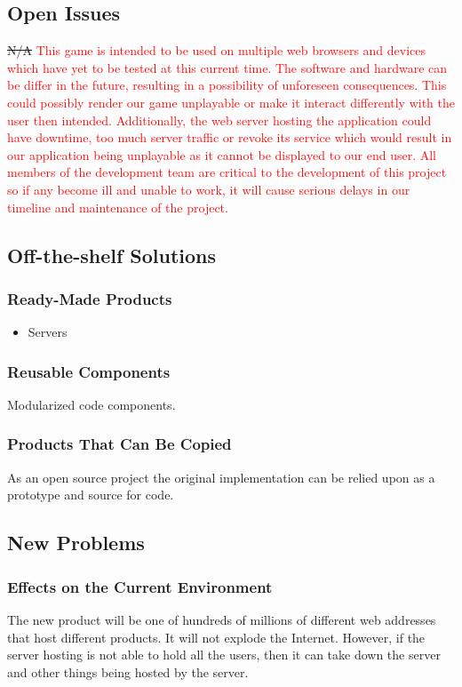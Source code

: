 \documentclass[11pt, oneside]{article}   	%
\begin{document}
\subsection{Open Issues}
\sout{N/A} \textcolor{red}{This game is intended to be used on multiple web browsers and devices which have yet to be tested at this current time. The software and hardware can be differ in the future, resulting in a possibility of unforeseen consequences. This could possibly render our game unplayable or make it interact differently with the user then intended. Additionally, the web server hosting the application could have downtime, too much server traffic or revoke its service which would result in our application being unplayable as it cannot be displayed to our end user. All members of the development team are critical to the development of this project so if any become ill and unable to work, it will cause serious delays in our timeline and maintenance of the project. }


\subsection{Off-the-shelf Solutions}
\subsubsection{Ready-Made Products}
\begin{itemize}
\item Servers
\end{itemize}


\subsubsection{Reusable Components}
Modularized code components.


\subsubsection{Products That Can Be Copied}
As an open source project the original implementation can be relied upon as a prototype and source for code.


\subsection{New Problems}
\subsubsection{Effects on the Current Environment}
The new product will be one of hundreds of millions of different web addresses that host different products. It will not explode the Internet. However, if the server hosting is not able to hold all the users, then it can take down the server and other things being hosted by the server.
\end{document}
